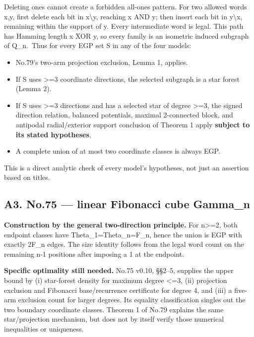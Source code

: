 \documentclass[
]{article}
\providecommand{\tightlist}{%
  \setlength{\itemsep}{0pt}\setlength{\parskip}{0pt}}
\begin{document}
Deleting ones cannot create a forbidden all-ones pattern. For two
allowed words x,y, first delete each bit in x\textbackslash{}y, reaching x AND y; then
insert each bit in y\textbackslash{}x, remaining within the support of y. Every
intermediate word is legal. This path has Hamming length \textbar x XOR
y\textbar, so every family is an isometric induced subgraph of
Q\_n.~Thus for every EGP set S in any of the four models:

\begin{itemize}
\tightlist
\item
  No.79's two-arm projection exclusion, Lemma 1, applies.
\item
  If S uses \textgreater=3 coordinate directions, the selected subgraph
  is a star forest (Lemma 2).
\item
  If S uses \textgreater=3 directions and has a selected star of degree
  \textgreater=3, the signed direction relation, balanced potentials,
  maximal 2-connected block, and antipodal radial/exterior support
  conclusion of Theorem 1 apply \textbf{subject to its stated
  hypotheses}.
\item
  A complete union of at most two coordinate classes is always EGP.
\end{itemize}

This is a direct analytic check of every model's hypotheses, not just an
assertion based on titles.

\subsection{A3. No.75 --- linear Fibonacci cube
Gamma\_n}\label{a3.-no.75-linear-fibonacci-cube-gamma_n}

\textbf{Construction by the general two-direction principle.} For
n\textgreater=2, both endpoint classes have
\textbar Theta\_1\textbar=\textbar Theta\_n\textbar=F\_n, hence the
union is EGP with exactly 2F\_n edges. The size identity follows from
the legal word count on the remaining n-1 positions after imposing a 1
at the endpoint.

\textbf{Specific optimality still needed.} No.75 v0.10, §§2--5, supplies
the upper bound by (i) star-forest density for maximum degree
\textless=3, (ii) projection exclusion and Fibonacci base/recurrence
certificate for degree 4, and (iii) a five-arm exclusion count for
larger degrees. Its equality classification singles out the two boundary
coordinate classes. Theorem 1 of No.79 explains the same star/projection
mechanism, but does not by itself verify those numerical inequalities or
uniqueness.
\end{document}
